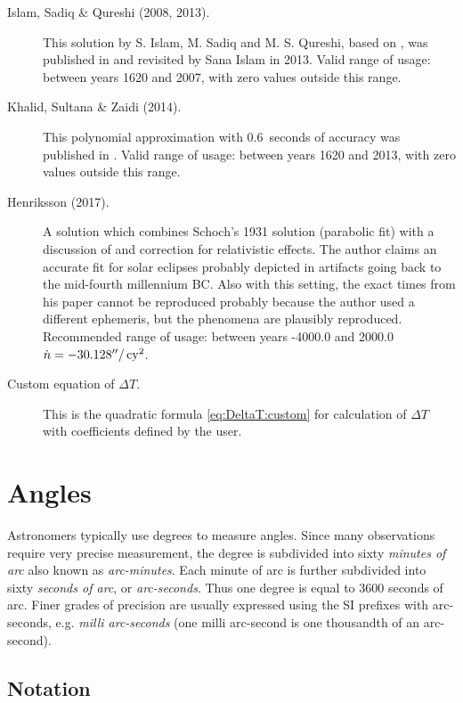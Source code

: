 \begin{description}
\item[Islam, Sadiq \& Qureshi (2008, 2013).] This solution by
  S. Islam, M. Sadiq and M. S. Qureshi, based on \citet{2000JBAA..110..323M}, was published in 
   and revisited by Sana Islam
  in 2013. Valid range of usage: between years 1620 and 2007, with
  zero values outside this range.

\item[Khalid, Sultana \& Zaidi (2014).] This polynomial approximation with 0.6~seconds 
  of accuracy was published in . 
  Valid range of usage: between years 1620 and 2013, with zero values outside this range.

\item[Henriksson (2017).]  A solution which combines Schoch's 1931
  solution (parabolic fit) with a discussion of and correction for relativistic effects.  The author
  claims an accurate fit for solar eclipses probably depicted in artifacts going back to the mid-fourth
  millennium BC.
  Also with this setting, the exact times from his paper \citep{Henriksson:2017} cannot be
  reproduced probably because the author used a different ephemeris, but the phenomena are
  plausibly reproduced.
  Recommended range of usage: between years -4000.0 and 2000.0 $\dot{n}=-30.128''/\,\mathrm{cy}^2$.

\item[Custom equation of $\Delta T$.] This is the quadratic formula \ref{eq:DeltaT:custom} for
  calculation of $\Delta T$ with coefficients defined by the user.
\end{description}


\section{Angles}
\label{sec:Concepts:Angles}

Astronomers typically use degrees to measure angles. Since many
observations require very precise measurement, the degree is subdivided
into sixty \emph{minutes of arc} also known as \emph{arc-minutes}. Each
minute of arc is further subdivided into sixty \emph{seconds of arc}, or
\emph{arc-seconds}. Thus one degree is equal to 3600 seconds of arc.
Finer grades of precision are usually expressed using the SI prefixes
with arc-seconds, e.g. \emph{milli arc-seconds} (one milli arc-second is
one thousandth of an arc-second).

\subsection{Notation}

